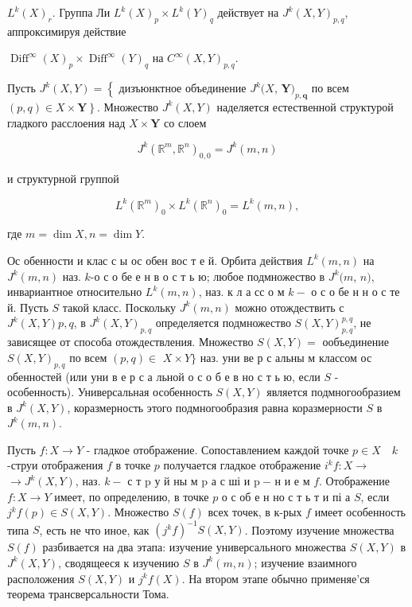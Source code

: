 \documentclass[10pt]{article}
\begin{document}
$L^{k}(X)_{r}$. Группа Ли $L^{k}(X)_{p} \times L^{k}(Y)_{q}$ действует на $J^{k}(X, Y)_{p, q}$, аппроксимируя действие

$\operatorname{Diff}^{\infty}(X)_{p} \times \operatorname{Diff}^{\infty}(Y)_{q}$ на $C^{\infty}(X, Y)_{p, q}$.

Пусть $J^{k}(X, Y)=\left\{\right.$ дизъюнктное объединение $J^{k}(X$, $\boldsymbol{Y})_{p, \boldsymbol{q}}$ по всем $\left.(p, q) \in X \times \boldsymbol{Y}\right\}$. Множество $J^{k}(X, Y)$ наделяется естественной структурой гладкого расслоения над $X \times \boldsymbol{Y}$ со слоем

\[
J^{k}\left(\mathbb{R}^{m}, \mathbb{R}^{n}\right)_{0,0}=J^{k}(m, n)
\]

и структурной группой

\[
L^{k}\left(\mathbb{R}^{m}\right)_{0} \times L^{k}\left(\mathbb{R}^{n}\right)_{0}=L^{k}(m, n),
\]

где $m=\operatorname{dim} X, n=\operatorname{dim} Y$.

Ос обенности и клас с ы ос обен вос т е й. Орбита действия $L^{k}(m, n)$ на $J^{k}(m, n)$ наз. $k$-о с о бе е н в о с т ь ю; любое подмножество в $J^{k}(m$, $n)$, инвариантное относительно $L^{k}(m, n)$, наз. к л а сс о м $k-$ о с о бе н н о с те й. Пусть $S$ такой класс. Поскольку $J^{k}(m, n)$ можно отождествить с $J^{k}(X, Y) p, q$, в $J^{k}(X, Y)_{p, q}$ определяется подмножество $S(X, Y)_{p, q}^{p, q}$, не зависящее от способа отождествления. Множество $S(X, Y)=$ ообъединение $S(X, Y)_{p, q}$ по всем $(p, q) \in$ $X \times Y\}$ наз. уни ве р с альны м классом ос обенностей (или уни в е р с а льной о с о б е в но с т ь ю, если $S$ - особенность). Универсальная особенность $S(X, Y)$ является подмногообразием в $J^{k}(X, Y)$, коразмерность этого подмногообразия равна коразмерности $S$ в $J^{k}(m, n)$.

Пусть $f: X \rightarrow Y$ - гладкое отображение. Сопоставлением каждой точке $p \in X \quad k$-струи отображения $f$ в точке $p$ получается гладкое отображение $i^{k} f: X \rightarrow$ $\rightarrow J^{k}(X, Y)$, наз. $k-$ с т $\mathrm{p}$ у й ны м $\mathrm{p}$ а с ші и $\mathrm{p} \mathbf{~} \mathbf{-}$ н и е м $f$. Отображение $f: X \rightarrow Y$ имеет, по определению, в точке $p$ о с об е н но с т ь т и пі а $S$, если $j^{k} f(p) \in S(X, Y)$. Множество $S(f)$ всех точек, в к-рых $f$ имеет особенность типа $S$, есть не что иное, как $\left(j^{k} f\right)^{-1} S(X, Y)$. Поэтому изучение множества $S(f)$ разбивается на два этапа: изучение универсального множества $S(X, Y)$ в $J^{k}(X, Y)$, сводящееся к изучению $S$ в $J^{k}(m, n)$; изучение взаимного расположения $S(X, Y)$ и $j^{k} f(X)$. На втором этапе обычно применяе'ся теорема трансверсальности Тома.
\end{document}
